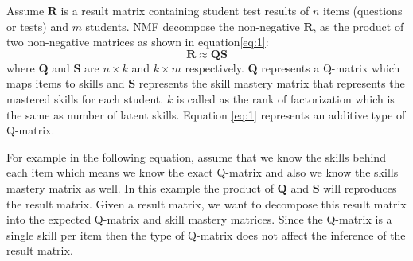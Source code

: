 Assume $\mathbf{R}$ is a result matrix containing student test results of ${n}$ items (questions or tests) and ${m}$ students. \ac{NMF} decompose the non-negative $\mathbf{R}$, as the product of two non-negative matrices as shown in equation\protect\eqref{eq:1}:
\begin{equation}
\mathbf{R}\approx\mathbf{Q}\mathbf{S}\label{eq:1}
\end{equation}
where $\mathbf{Q}$ and $\mathbf{S}$ are ${n}\times{k}$ and ${k}\times{m}$ respectively. $\mathbf{Q}$ represents a Q-matrix which maps items to skills and $\mathbf{S}$ represents the skill mastery matrix that represents the mastered skills for each student. ${k}$ is called as the rank of factorization which is the same as number of latent skills. Equation \ref{eq:1} represents an additive type of Q-matrix.

For example in the following equation, assume that we know the skills behind each item which means we know the exact Q-matrix and also we know the skills mastery matrix as well. In this example the product of $\mathbf{Q}$ and $\mathbf{S}$ will reproduces the result matrix. Given a result matrix, we want to decompose this result matrix into the expected Q-matrix and skill mastery matrices. Since the Q-matrix is a single skill per item then the type of Q-matrix does not affect the inference of the result matrix.

